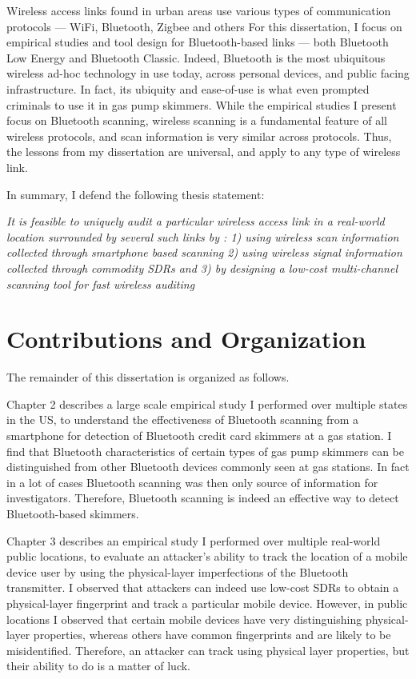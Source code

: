 Wireless access links found in urban areas use various types of communication protocols --- WiFi, Bluetooth, Zigbee and others
%
For this dissertation, I focus on empirical studies and tool design for Bluetooth-based links --- both Bluetooth Low Energy and Bluetooth Classic.
%
Indeed, Bluetooth is the most ubiquitous wireless ad-hoc  technology in use today, across personal devices, and public facing infrastructure.
%
In fact, its ubiquity and ease-of-use is what even prompted criminals to use it in gas pump skimmers.
%
While the empirical studies I present focus on Bluetooth scanning, wireless scanning is a fundamental feature of all wireless protocols, and scan information is very similar across protocols.
%
Thus, the lessons from my dissertation are universal, and apply to any type of wireless link.

In summary, I defend the following thesis statement:

\textit{It is feasible to uniquely audit a particular wireless access link in a real-world location surrounded by several such links by : 1) using wireless scan information collected through smartphone based scanning 2) using wireless signal information collected through commodity SDRs and 3) by designing a low-cost multi-channel scanning tool for fast wireless auditing}



\section{Contributions and Organization}
The remainder of this dissertation is organized as follows. 
%

Chapter 2 describes a large scale empirical study I performed over multiple states in the US, to understand the effectiveness of Bluetooth scanning from a smartphone for detection of Bluetooth credit card skimmers at a gas station. I find that Bluetooth characteristics of certain types of gas pump skimmers can be distinguished from other Bluetooth devices commonly seen at gas stations. In fact in a lot of cases Bluetooth scanning was then only source of information for investigators. Therefore, Bluetooth scanning is indeed an effective way to detect Bluetooth-based skimmers.
%

Chapter 3 describes an empirical study I performed over multiple real-world public locations, to evaluate an attacker's ability to track the location of a mobile device user by using the physical-layer imperfections of the Bluetooth transmitter. I observed that attackers can indeed use low-cost SDRs to obtain a physical-layer fingerprint and track a particular mobile device. However, in public locations I observed that certain mobile devices have very distinguishing physical-layer properties, whereas others have common fingerprints and are likely to be misidentified. Therefore, an attacker can track using physical layer properties, but their ability to do is a matter of luck. 
%

